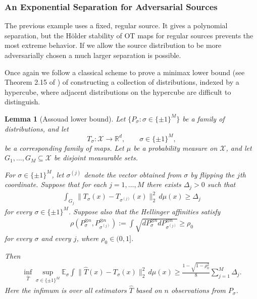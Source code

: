 \documentclass[11pt,twoside]{article}
\newtheorem{lemma}{Lemma}
\begin{document}
\subsubsection{An Exponential Separation for Adversarial Sources}

The previous example uses a fixed, regular source. It gives a polynomial separation, but the H\"older stability of OT maps for regular sources prevents the most extreme behavior. If we allow the source distribution to be more adversarially chosen a much larger separation is possible.

Once again we follow a classical scheme to prove a minimax lower bound (see Theorem 2.15 of \citet{tsybakov2008}) of constructing a collection of distributions, indexed by a hypercube,
where adjacent distributions on the hypercube are difficult to distinguish.
\begin{lemma}[Assouad lower bound]
\label{lem:assouad-map-hellinger}
Let $\{P_\sigma:\sigma\in\{\pm1\}^M\}$ be a family of distributions, and let
\[
T_\sigma:\mathcal X\to\mathbb R^d,
\qquad \sigma\in\{\pm1\}^M,
\]
be a corresponding family of maps. Let $\mu$ be a probability measure on
$\mathcal X$, and let $G_1,\ldots,G_M\subseteq\mathcal X$ be disjoint
measurable sets.

For $\sigma\in\{\pm1\}^M$, let $\sigma^{(j)}$ denote the vector obtained
from $\sigma$ by flipping the $j$th coordinate. Suppose that for each
$j=1,\ldots,M$ there exists $\Delta_j>0$ such that
\begin{align}
\label{eq:assouad-local-separation}
\int_{G_j}
\|T_\sigma(x)-T_{\sigma^{(j)}}(x)\|_2^2\,d\mu(x)
\geq
\Delta_j
\end{align}
for every $\sigma\in\{\pm1\}^M$. Suppose also that the Hellinger
affinities satisfy
\begin{align}
\label{eq:assouad-affinity}
\rho(P_\sigma^{\otimes n},P_{\sigma^{(j)}}^{\otimes n})
:=
\int \sqrt{dP_\sigma^{\otimes n} dP^{\otimes n}_{\sigma^{(j)}}}
\geq
\rho_0
\end{align}
for every $\sigma$ and every $j$, where $\rho_0\in(0,1]$.

Then
\begin{align}
\label{eq:assouad-map-conclusion}
\inf_{\widehat T}
\sup_{\sigma\in\{\pm1\}^M}
\mathbb E_\sigma
\int
\|\widehat T(x)-T_\sigma(x)\|_2^2\,d\mu(x)
\geq
\frac{1-\sqrt{1-\rho_0^2}}{8}
\sum_{j=1}^M \Delta_j .
\end{align}
Here the infimum is over all estimators $\widehat T$ based on $n$ 
observations from $P_\sigma$.
\end{lemma}
\end{document}
